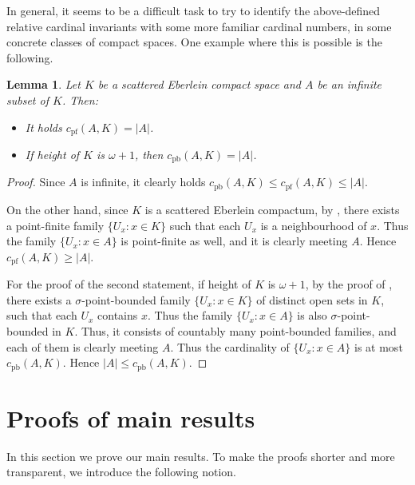 \documentclass{amsart}
\numberwithin{equation}{section}
\newtheorem{lemma}[thm]{Lemma}
\theoremstyle{definition}
\newcommand{\abs}[1]{\left| #1  \right|}
\begin{document}
In general, it seems to be a difficult task to try to identify the above-defined relative cardinal invariants with some more familiar cardinal numbers, in some concrete classes of compact spaces. One example where this is possible is the following.

\begin{lemma}
\label{cel-Eberlein}
Let $K$ be a scattered Eberlein compact space and $A$ be an infinite subset of $K$. Then:
\begin{itemize}
    \item[(i)] It holds $c_{\text{pf}}(A, K)=\abs{A}$.
    \item[(ii)] If height of $K$ is $\omega+1$, then $c_{\text{pb}}(A, K)=\abs{A}$.
    \end{itemize}
\end{lemma}

\begin{proof}
Since $A$ is infinite, it clearly holds $c_{\text{pb}}(A, K) \leq c_{\text{pf}}(A, K) \leq \abs{A}$.

On the other hand, since $K$ is a scattered Eberlein compactum, by \cite[Lemma 1.1]{Bell2007OnSE}, there
exists a point-finite family $\{U_x: x \in K\}$ such that each $U_x$ is a neighbourhood of $x$. Thus the family $\{U_x: x \in A\}$ is point-finite as well, and it is clearly meeting $A$. Hence $c_{\text{pf}}(A, K) \geq \abs{A}$.

For the proof of the second statement, if height of $K$ is $\omega+1$, by the proof of \cite[Theorem 0.1]{Bell2007OnSE}, there exists a $\sigma$-point-bounded family $\{U_x : x \in K\}$ of distinct open sets in $K$, such that each $U_x$ contains $x$. Thus the family $\{ U_x : x \in A\}$ is also $\sigma$-point-bounded in $K$. Thus, it consists of countably many point-bounded families, and each of them is clearly meeting $A$. Thus the cardinality of $\{ U_x : x \in A\}$ is at most $c_{\text{pb}}(A, K)$. Hence $\abs{A} \leq c_{\text{pb}}(A, K)$.
\end{proof}


\section{Proofs of main results}

In this section we prove our main results. To make the proofs shorter and more transparent, we introduce the following notion.
\end{document}
